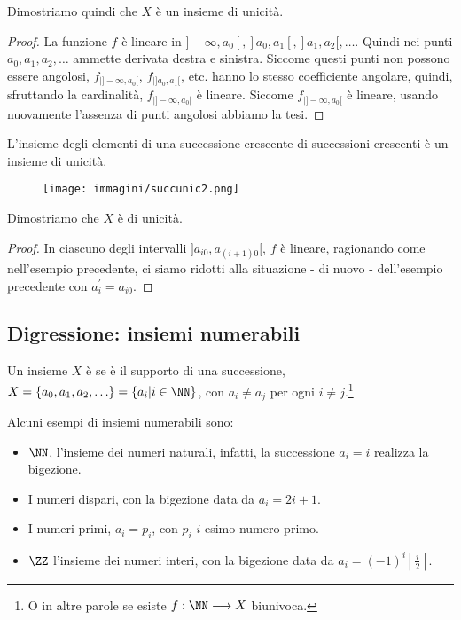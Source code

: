 \documentclass[11pt]{scrartcl}
\begin{document}
Dimostriamo quindi che $X$ è un insieme di unicità.
\begin{proof}
La funzione $f$ è lineare in $]-\infty, a_0[, ]a_0,a_1[, ]a_1,a_2[, \ldots$. Quindi nei punti $a_0,a_1,a_2,\ldots$ ammette derivata destra e sinistra. 
Siccome questi punti non possono essere angolosi, $f_{|]-\infty, a_0[}$, $f_{|]a_0,a_1[}$, etc. hanno lo stesso coefficiente angolare, quindi, sfruttando la cardinalità, $f_{|]-\infty, a_0[}$
è lineare. Siccome $f_{|]-\infty, a_0[}$ è lineare, usando nuovamente l'assenza di punti angolosi abbiamo la tesi.
\end{proof}

\begin{examplebb}
L'insieme degli elementi di una successione crescente di successioni crescenti è un insieme di unicità.
\end{examplebb}

\begin{center}
	\begin{figure}[h]
		\centering
		\texttt{[image: immagini/succunic2.png]}
	\end{figure}
\end{center}

Dimostriamo che $X$ è di unicità.
\begin{proof}
In ciascuno degli intervalli $]a_{i0}, a_{(i+1)0}[$, $f$ è lineare, ragionando come nell'esempio precedente, ci siamo ridotti alla situazione
- di nuovo - dell'esempio precedente con $a_i^{\prime} = a_{i0}$.
\end{proof}

\subsection{Digressione: insiemi numerabili}
\begin{definition}
	Un insieme $X$ è  se è il supporto di una successione, $X = \{a_0,a_1,a_2,\ldots\} = \{a_i | i \in \NN\}$, con $a_i \ne a_j$ per ogni $i \ne j$.\footnote{O in altre parole se esiste $f : \NN \longrightarrow X$ biunivoca.}
\end{definition}

\begin{example}
	Alcuni esempi di insiemi numerabili sono:
	\begin{itemize}
		\item $\NN$, l'insieme dei numeri naturali, infatti, la successione $a_i = i$ realizza la bigezione.
		\item I numeri dispari, con la bigezione data da $a_i = 2i + 1$.
		\item I numeri primi, $a_i = p_i$, con $p_i$ $i$-esimo numero primo.
		\item $\ZZ$ l'insieme dei numeri interi, con la bigezione data da $a_i = \displaystyle (-1)^i \left\lceil\frac{i}{2}\right\rceil$.
	\end{itemize}
\end{example}
\end{document}
